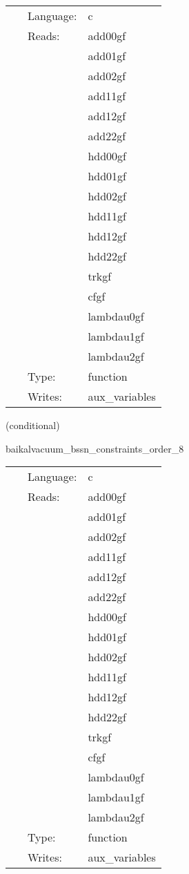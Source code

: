  \begin{tabular*}{160mm}{cll} 
~ & Language:  & c \\ 
~ & Reads:  & add00gf \\ 
~& ~ &add01gf\\ 
~& ~ &add02gf\\ 
~& ~ &add11gf\\ 
~& ~ &add12gf\\ 
~& ~ &add22gf\\ 
~& ~ &hdd00gf\\ 
~& ~ &hdd01gf\\ 
~& ~ &hdd02gf\\ 
~& ~ &hdd11gf\\ 
~& ~ &hdd12gf\\ 
~& ~ &hdd22gf\\ 
~& ~ &trkgf\\ 
~& ~ &cfgf\\ 
~& ~ &lambdau0gf\\ 
~& ~ &lambdau1gf\\ 
~& ~ &lambdau2gf\\ 
~ & Type:  & function \\ 
~ & Writes:  & aux\_variables \\ 
\end{tabular*} 


\vspace{5mm}

   (conditional) 

\hspace{5mm} baikalvacuum\_bssn\_constraints\_order\_8 

\hspace{5mm}{\it compute bssn (hamiltonian and momentum) constraints, at finite-differencing order 8 } 


\hspace{5mm}

 \begin{tabular*}{160mm}{cll} 
~ & Language:  & c \\ 
~ & Reads:  & add00gf \\ 
~& ~ &add01gf\\ 
~& ~ &add02gf\\ 
~& ~ &add11gf\\ 
~& ~ &add12gf\\ 
~& ~ &add22gf\\ 
~& ~ &hdd00gf\\ 
~& ~ &hdd01gf\\ 
~& ~ &hdd02gf\\ 
~& ~ &hdd11gf\\ 
~& ~ &hdd12gf\\ 
~& ~ &hdd22gf\\ 
~& ~ &trkgf\\ 
~& ~ &cfgf\\ 
~& ~ &lambdau0gf\\ 
~& ~ &lambdau1gf\\ 
~& ~ &lambdau2gf\\ 
~ & Type:  & function \\ 
~ & Writes:  & aux\_variables \\ 
\end{tabular*} 


